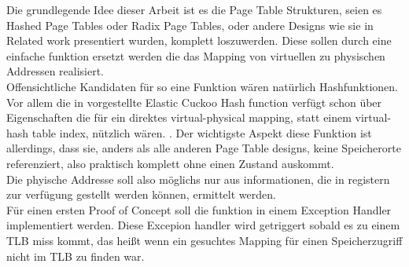 
Die grundlegende Idee dieser Arbeit ist es die Page Table Strukturen, seien es Hashed Page Tables oder
Radix Page Tables, oder andere Designs wie sie in Related work presentiert wurden, komplett loszuwerden.
Diese sollen durch eine einfache funktion ersetzt werden die das Mapping von virtuellen zu physischen
Addressen realisiert.\\
Offensichtliche Kandidaten für so eine Funktion wären natürlich Hashfunktionen. Vor allem die in
\cite{skarlatos2020elastic} vorgestellte Elastic Cuckoo Hash function verfügt schon über Eigenschaften
die für ein direktes virtual-physical mapping, statt einem virtual-hash table index, nützlich wären.
.
Der wichtigste Aspekt diese Funktion ist allerdings, dass sie, anders als alle anderen Page Table designs,
keine Speicherorte referenziert, also praktisch komplett ohne einen Zustand auskommt.\\
Die phyische Addresse soll also möglichs nur aus informationen,  die in registern zur verfügung
gestellt werden können, ermittelt werden.\\
Für einen ersten Proof of Concept soll die funktion in einem Exception Handler implementiert werden.
Diese Excepion handler wird getriggert sobald es zu einem TLB miss kommt, das heißt wenn ein
gesuchtes Mapping für einen Speicherzugriff nicht im TLB zu finden war.

